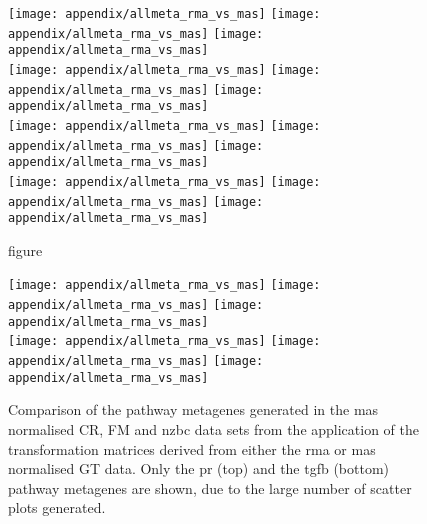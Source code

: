 	\begin{figure}[htpb]
		\ContinuedFloat
		\captionsetup{list=off,format=cont}
		\centering
		\texttt{[image: appendix/allmeta\_rma\_vs\_mas]}
		\texttt{[image: appendix/allmeta\_rma\_vs\_mas]}
		\texttt{[image: appendix/allmeta\_rma\_vs\_mas]}\\
		\texttt{[image: appendix/allmeta\_rma\_vs\_mas]}
		\texttt{[image: appendix/allmeta\_rma\_vs\_mas]}
		\texttt{[image: appendix/allmeta\_rma\_vs\_mas]}\\
		\texttt{[image: appendix/allmeta\_rma\_vs\_mas]}
		\texttt{[image: appendix/allmeta\_rma\_vs\_mas]}
		\texttt{[image: appendix/allmeta\_rma\_vs\_mas]}\\
		\texttt{[image: appendix/allmeta\_rma\_vs\_mas]}
		\texttt{[image: appendix/allmeta\_rma\_vs\_mas]}
		\texttt{[image: appendix/allmeta\_rma\_vs\_mas]}\\
		\caption[]{figure}
	\end{figure}

	\begin{figure}[htp!]
		\centering
		\texttt{[image: appendix/allmeta\_rma\_vs\_mas]}
		\texttt{[image: appendix/allmeta\_rma\_vs\_mas]}
		\texttt{[image: appendix/allmeta\_rma\_vs\_mas]}\\
		\texttt{[image: appendix/allmeta\_rma\_vs\_mas]}
		\texttt{[image: appendix/allmeta\_rma\_vs\_mas]}
		\texttt{[image: appendix/allmeta\_rma\_vs\_mas]}
		\caption[Comparison of the pathway metagenes generated in the \acrshort{mas} normalised CR, FM and \gls{nzbc} data sets from the application of the transformation matrices derived from either the \acrshort{rma} or \acrshort{mas} normalised GT data]{Comparison of the pathway metagenes generated in the \acrshort{mas} normalised CR, FM and \gls{nzbc} data sets from the application of the transformation matrices derived from either the \acrshort{rma} or \acrshort{mas} normalised GT data.
	Only the \gls{pr} (top) and the \gls{tgfb}  (bottom) pathway metagenes are shown, due to the large number of scatter plots generated.
	}
		\label{fig:appendix/gt_meta_rma_mas_other_data}
	\end{figure}

